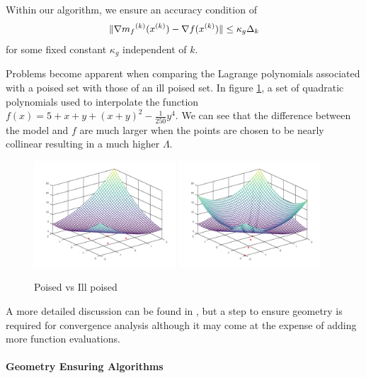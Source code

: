 Within our algorithm, we ensure an accuracy condition of 
\begin{equation}
\label{accuracy}
\|\nabla {{m}_f}^{(k)}({x}^{(k)}) - \nabla f({x}^{(k)}) \| \le \kappa_g \Delta_k
\end{equation}
 for some fixed constant $\kappa_g$ independent of $k$.

 

Problems become apparent when comparing the Lagrange polynomials associated with a poised set with those of an ill poised set.
In figure \cref{pvip}, a set of quadratic polynomials used to interpolate the function $f(x) = 5 + x + y + (x + y) ^ 2 - \frac 1 {250} y ^ 4$.
We can see that the difference between the model and $f$ are much larger when the points are chosen to be nearly collinear resulting in a much higher $\Lambda$.

\begin{figure}[h]
    \centering
    \includegraphics[width=200px]{images/poised_good.png}
    \includegraphics[width=200px]{images/poised_bad.png}
    \caption{Poised vs Ill poised}
    \label{pvip}
\end{figure}


A more detailed discussion can be found in \cite{doi:10.1080/10556780802409296}, but a step to ensure geometry is required for convergence analysis although it may come at the expense of adding more function evaluations.

\paragraph{Geometry Ensuring Algorithms}

